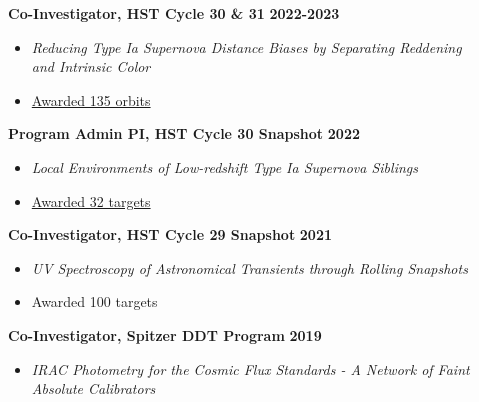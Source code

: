 \documentclass[margin]{res}
\begin{document}
\begin{resume}
\newpage
{\bf Co-Investigator, HST Cycle 30 \& 31} \hfill {\bf 2022-2023}
\begin{itemize} \itemsep -2pt %
     \item[] \textit{Reducing Type Ia Supernova Distance Biases by Separating Reddening\\and Intrinsic Color}
     \item[] \href{https://archive.stsci.edu/proposal_search.php?id=17128&mission=hst}{Awarded 135 orbits}
     \end{itemize} \vspace{-12pt}
     
{\bf Program Admin PI, HST Cycle 30 Snapshot} \hfill {\bf 2022}
\begin{itemize} \itemsep -2pt %
     \item[] \textit{Local Environments of Low-redshift Type Ia Supernova Siblings}
     \item[] \href{https://archive.stsci.edu/proposal_search.php?id=17194&mission=hst}{Awarded 32 targets}
     \end{itemize} \vspace{-12pt}


{\bf Co-Investigator, HST Cycle 29 Snapshot} \hfill {\bf 2021}
\begin{itemize} \itemsep -2pt %
     \item[] \textit{UV Spectroscopy of Astronomical Transients through Rolling Snapshots}
     \item[] Awarded 100 targets
     \end{itemize} \vspace{-12pt}

{\bf Co-Investigator, Spitzer DDT Program} \hfill {\bf 2019}
    \begin{itemize} \itemsep -2pt %
     \item[] \textit{IRAC Photometry for the Cosmic Flux Standards - A Network of Faint \\Absolute Calibrators}
     \end{itemize} \vspace{-12pt}



\end{resume}
\end{document}

